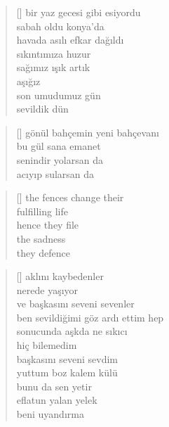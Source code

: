\documentclass[10pt, openright, twoside]{memoir}
\theoremstyle{definition}
\begin{document}
\vspace*{\fill}
%
\newpage
{}
\vspace*{\fill}
\settowidth{\versewidth}{bir yaz gecesi gibi esiyordu}
\begin{verse}[\versewidth]
  bir yaz gecesi gibi esiyordu \\
  sabah oldu konya'da \\
  havada asılı efkar dağıldı \\
  sıkıntımıza huzur \\
  sağımız ışık artık \\
  aşığız \\
  son umudumuz gün \\
  sevildik dün \\
\end{verse}
\vspace*{\fill}
%
\newpage
{}
\vspace*{\fill}
\settowidth{\versewidth}{gönül bahçemin yeni bahçevanı}
\begin{verse}[\versewidth]
  gönül bahçemin yeni bahçevanı \\
  bu gül sana emanet \\
  senindir yolarsan da \\
  acıyıp sularsan da \\
\end{verse}
\vspace*{\fill}
%
\newpage
{}
\vspace*{\fill}
\settowidth{\versewidth}{the fences change their}
\begin{verse}[\versewidth]
  the fences change their \\
  fulfilling life \\
  hence they file \\
  the sadness \\
  they defence \\
\end{verse}
\vspace*{\fill}
%
\newpage
{}
\vspace*{\fill}
\settowidth{\versewidth}{ben sevildiğimi göz ardı ettim hep}
\begin{verse}[\versewidth]
  aklını kaybedenler \\
  nerede yaşıyor \\
  ve başkasını seveni sevenler \\
  ben sevildiğimi göz ardı ettim hep \\
  sonucunda aşkda ne sıkıcı \\
  hiç bilemedim \\
  başkasını seveni sevdim \\
  yuttum boz kalem külü \\
  bunu da sen yetir \\
  eflatun yalan yelek \\
  beni uyandırma \\
\end{verse}
\end{document}
